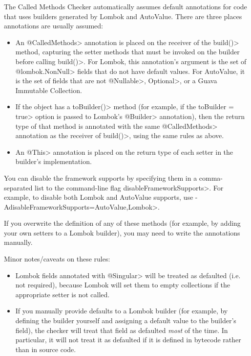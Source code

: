 The Called Methods Checker automatically assumes default annotations for code that uses builders generated
by Lombok and AutoValue. There are three places annotations are usually assumed:
\begin{itemize}
\item An \<@CalledMethods> annotation is placed on the receiver of the \<build()> method, capturing the
setter methods that must be invoked on the builder before calling \<build()>. For Lombok,
this annotation's argument is the set of \<@lombok.NonNull> fields that do not have default values.
For AutoValue, it is the set of fields that are not \<@Nullable>, \<Optional>, or a Guava Immutable
Collection.
\item If the object has a \<toBuilder()> method (for example, if the \<toBuilder = true> option is
passed to Lombok's \<@Builder> annotation), then the return type of that method is annotated with
the same \<@CalledMethods> annotation as the receiver of \<build()>, using the same rules as above.
\item An \<@This> annotation is placed on the return type of each setter in the builder's implementation.
\end{itemize}

You can disable the framework supports by specifying them in a comma-separated list to the
command-line flag \<disableFrameworkSupports>.  For example, to disable both Lombok and AutoValue supports,
use \<-AdisableFrameworkSupports=AutoValue,Lombok>.

If you overwrite the definition of any of these methods (for example, by adding your own setters to
a Lombok builder), you may need to write the annotations manually.

Minor notes/caveats on these rules:
\begin{itemize}
\item Lombok fields annotated with \<@Singular> will be treated as defaulted (i.e. not required), because
Lombok will set them to empty collections if the appropriate setter is not called.
\item If you manually provide defaults to a Lombok builder (for example, by defining the builder yourself
and assigning a default value to the builder's field), the checker will treat that field as defaulted
\emph{most} of the time. In particular, it will not treat it as defaulted if it is defined in bytecode rather
than in source code.
\end{itemize}

